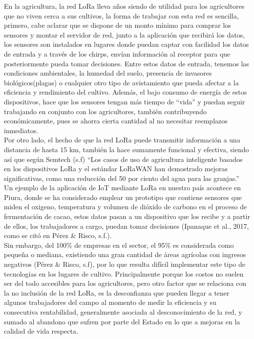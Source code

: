\documentclass[12pt,a4paper]{article}
\begin{document}
	En la agricultura, la red LoRa lleva años siendo de utilidad para los agricultores que no viven cerca a sus cultivos, la forma de trabajar con esta red es sencilla, primero, cabe aclarar que se dispone de un monto mínimo para comprar los sensores y montar el servidor de red, junto a la aplicación que recibirá los datos, los sensores son instalados en lugares donde puedan captar con facilidad los datos de entrada y a través de los chirps, envían información al receptor para que posteriormente pueda tomar decisiones. Entre estos datos de entrada, tenemos las condiciones ambientales, la humedad del suelo, presencia de invasores biológicos(plagas) o cualquier otro tipo de avistamiento que pueda afectar a la eficiencia y rendimiento del cultivo. Además, el bajo consumo de energía de estos dispositivos, hace que los sensores tengan más tiempo de “vida” y puedan seguir trabajando en conjunto con los agricultores, también contribuyendo económicamente, pues se ahorra cierta cantidad al no necesitar reemplazos inmediatos.\\
	
	Por otro lado, el hecho de que la red LoRa puede transmitir información a una distancia de hasta 15 km, también la hace sumamente funcional y efectiva, siendo así que según Semtech (s.f) “Los casos de uso de agricultura inteligente basados en los dispositivos LoRa y el estándar LoRaWAN han demostrado mejoras significativas, como una reducción del 50 por ciento del agua para las granjas.” Un ejemplo de la aplicación de IoT mediante LoRa en nuestro país acontece en Piura, donde se ha considerado emplear un prototipo que contiene sensores que miden el oxigeno, temperatura y volumen de dióxido de carbono en el proceso de fermentación de cacao, estos datos pasan a un dispositivo que los recibe y a partir de ellos, los trabajadores a cargo, puedan tomar decisiones (Ipanaque et al., 2017, como se citó en Pérez \& Risco, s.f.).\\
	
	Sin embargo, del 100\% de empresas en el sector, el 95\% es considerada como pequeña o mediana, existiendo una gran cantidad de áreas agrícolas con ingresos negativos (Pérez \& Risco, s.f), por lo que resulta difícil implementar este tipo de tecnologías en los lugares de cultivo. Principalmente porque los costos no suelen ser del todo accesibles para los agricultores, pero otro factor que se relaciona con la no inclusión de la red LoRa, es la desconfianza que pueden llegar a tener algunos trabajadores del campo al momento de medir la eficiencia y su consecutiva rentabilidad, generalmente asociada al desconocimiento de la red, y sumado al abandono que sufren por parte del Estado en lo que a mejoras en la calidad de vida respecta.\\
	
\end{document}
